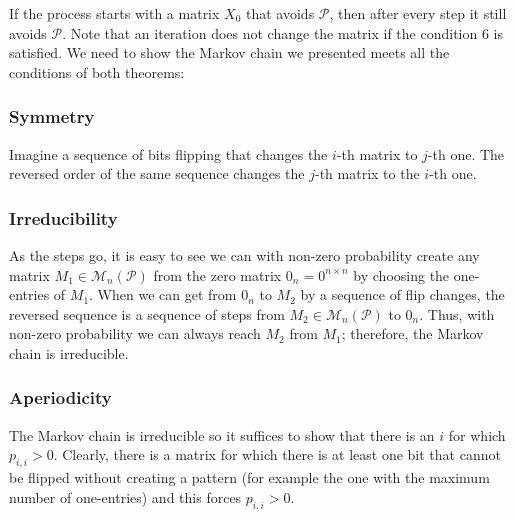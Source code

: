 If the process starts with a matrix $X_0$ that avoids $\mathcal{P}$, then after every step it still avoids $\mathcal{P}$. Note that an iteration does not change the matrix if the condition 6 is satisfied. We need to show the Markov chain we presented meets all the conditions of both theorems:
\subsubsection{Symmetry}
Imagine a sequence of bits flipping that changes the $i$-th matrix to $j$-th one. The reversed order of the same sequence changes the $j$-th matrix to the $i$-th one.
\subsubsection{Irreducibility}
As the steps go, it is easy to see we can with non-zero probability create any matrix $M_1\in\mathcal{M}_n(\mathcal{P})$ from the zero matrix $0_n=0^{n\times n}$ by choosing the one-entries of $M_1$. When we can get from $0_n$ to $M_2$ by a sequence of flip changes, the reversed sequence is a sequence of steps from $M_2\in\mathcal{M}_n(\mathcal{P})$ to $0_n$. Thus, with non-zero probability we can always reach $M_2$ from $M_1$; therefore, the Markov chain is irreducible.
\subsubsection{Aperiodicity}
The Markov chain is irreducible so it suffices to show that there is an $i$ for which $p_{i,i}>0$. Clearly, there is a matrix for which there is at least one bit that cannot be flipped without creating a pattern (for example the one with the maximum number of one-entries) and this forces $p_{i,i}>0$.